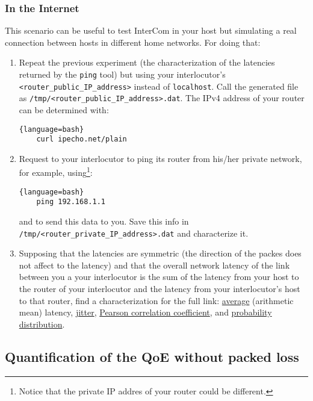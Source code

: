 \subsubsection{In the Internet}

This scenario can be useful to test InterCom in your host but
simulating a real connection between hosts in different home
networks. For doing that:

\begin{enumerate}
  
\item Repeat the previous experiment (the characterization of the
  latencies returned by the \texttt{ping} tool) but using your
  interlocutor's \texttt{<router\_public\_IP\_address>} instead
  of \texttt{localhost}. Call the generated file
  as \texttt{/tmp/<router\_public\_IP\_address>.dat}. The IPv4 address
  of your router can be determined with:
  \begin{lstlisting}{language=bash}
    curl ipecho.net/plain
  \end{lstlisting}  
  
\item Request to your interlocutor to ping its router from his/her
  private network, for example, using\footnote{Notice that the private
  IP addres of your router could be different.}:
  \begin{lstlisting}{language=bash}
    ping 192.168.1.1
  \end{lstlisting}
  and to send this data to you. Save this info in
  \texttt{/tmp/<router\_private\_IP\_address>.dat} and characterize
  it.

\item Supposing that the latencies are symmetric (the direction of the
  packes does not affect to the latency) and that the overall network
  latency of the link between you a your interlocutor is the sum of
  the latency from your host to the router of your interlocutor and
  the latency from your interlocutor's host to that router, find a
  characterization for the full link:
  \href{https://en.wikipedia.org/wiki/Average}{average} (arithmetic
  mean) latency, \href{https://en.wikipedia.org/wiki/Jitter}{jitter},
  \href{https://en.wikipedia.org/wiki/Pearson_correlation_coefficient}{Pearson
    correlation coefficient}, and
  \href{https://en.wikipedia.org/wiki/List_of_probability_distributions}{probability
    distribution}.

\end{enumerate}

\subsection{Quantification of the QoE without packed loss}

